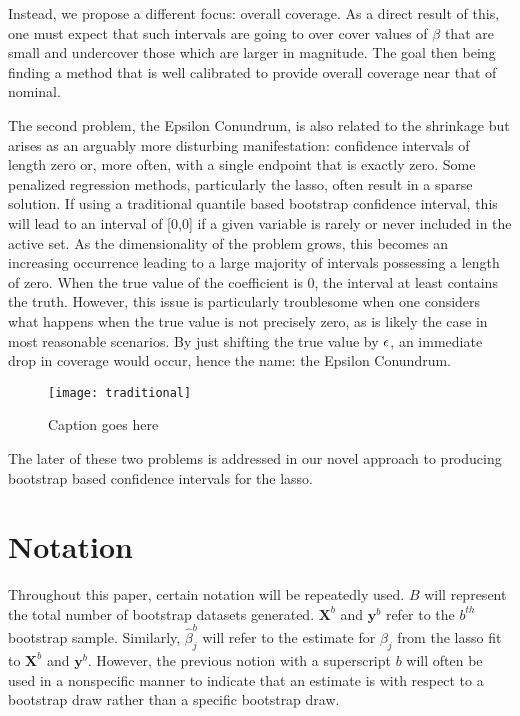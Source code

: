 Instead, we propose a different focus: overall coverage. As a direct result of this, one must expect that such intervals are going to over cover values of $\beta$ that are small and undercover those which are larger in magnitude. The goal then being finding a method that is well calibrated to provide overall coverage near that of nominal.

The second problem, the Epsilon Conundrum, is also related to the shrinkage but arises as an arguably more disturbing manifestation: confidence intervals of length zero or, more often, with a single endpoint that is exactly zero. Some penalized regression methods, particularly the lasso, often result in a sparse solution. If using a traditional quantile based bootstrap confidence interval, this will lead to an interval of [0,0] if a given variable is rarely or never included in the active set. As the dimensionality of the problem grows, this becomes an increasing occurrence leading to a large majority of intervals possessing a length of zero. When the true value of the coefficient is 0, the interval at least contains the truth. However, this issue is particularly troublesome when one considers what happens when the true value is not precisely zero, as is likely the case in most reasonable scenarios. By just shifting the true value by $\epsilon$, an immediate drop in coverage would occur, hence the name: the Epsilon Conundrum.

\begin{figure}
  \texttt{[image: traditional]}
  \caption{\label{Fig:traditional} Caption goes here}
\end{figure}

The later of these two problems is addressed in our novel approach to producing bootstrap based confidence intervals for the lasso.

\section{Notation}

Throughout this paper, certain notation will be repeatedly used. $B$ will represent the total number of bootstrap datasets generated. $\boldsymbol{X}^b$ and $\boldsymbol{y}^b$ refer to the $b^{th}$ bootstrap sample. Similarly, $\hat{\beta}^b_j$ will refer to the estimate for $\beta_j$ from the lasso fit to $\boldsymbol{X}^b$ and $\boldsymbol{y}^b$. However, the previous notion with a superscript $b$ will often be used in a nonspecific manner to indicate that an estimate is with respect to a bootstrap draw rather than a specific bootstrap draw.

